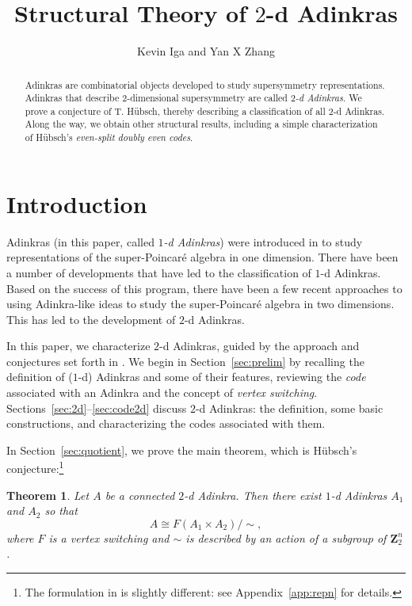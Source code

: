\documentclass[12pt,twoside,singlespace]{article}
\title{Structural Theory of $2$-d Adinkras}
\author{Kevin Iga and Yan X Zhang}
\numberwithin{equation}{section}
\newtheorem{thm}[equation]{Theorem}
\theoremstyle{definition}
\newcommand{\ZZ}{\mathbf{Z}}
\begin{document}
\pagestyle{plain}

\maketitle

\begin{abstract}
Adinkras are combinatorial objects developed to study supersymmetry representations.  Adinkras that describe $2$-dimensional supersymmetry are called \emph{$2$-d Adinkras}.  We prove a conjecture of T. H\"ubsch, thereby describing a classification of all $2$-d Adinkras.  Along the way, we obtain other structural results, including a simple characterization of H\"ubsch's \emph{even-split doubly even codes}.
\end{abstract}


\section{Introduction}
Adinkras (in this paper, called \emph{$1$-d Adinkras}) were introduced in \cite{d2l:first} to study representations of the super-Poincar\'e algebra in one dimension.  There have been a number of developments that have led to the classification of $1$-d Adinkras.\cite{d2l:decodes,d2l:topology, d2l:graph-theoretic,dil:cohomology,d2l:omni,zhang:adinkras}  Based on the success of this program, there have been a few recent approaches to using Adinkra-like ideas to study the super-Poincar\'e algebra in two dimensions.  This has led to the development of $2$-d Adinkras.\cite{gates:dimensional_extension,hubsch:weaving}

In this paper, we characterize $2$-d Adinkras, guided by the approach and conjectures set forth in \cite{hubsch:weaving}. We begin in Section~\ref{sec:prelim} by recalling the definition of ($1$-d) Adinkras and some of their features, reviewing the \emph{code} associated with an Adinkra\cite{d2l:omni} and the concept of \emph{vertex switching}.\cite{dil:cohomology,zhang:adinkras}  Sections~\ref{sec:2d}--\ref{sec:code2d} discuss $2$-d Adinkras: the definition, some basic constructions, and characterizing the codes associated with them.

In Section~\ref{sec:quotient}, we prove the main theorem, which is H\"ubsch's conjecture:\footnote{The formulation in \cite{hubsch:weaving} is slightly different: see Appendix~\ref{app:repn} for details.}

\begin{thm}
\label{thm:main}
Let $A$ be a connected $2$-d Adinkra.  Then there exist $1$-d Adinkras $A_1$ and $A_2$ so that
\[A\cong F(A_1\times A_2)/\sim, \]
where $F$ is a vertex switching and  $\sim$ is described by an action of a subgroup of $\ZZ_2^n$.
\end{thm}
\end{document}
